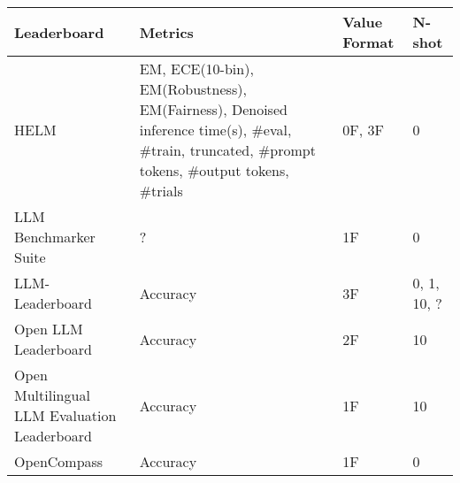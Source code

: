 \begin{tabular}{llll}
\toprule
Leaderboard & Metrics & Value Format & N-shot \\
\midrule
HELM & EM, ECE(10-bin), EM(Robustness), EM(Fairness), Denoised inference time(s), \#eval, \#train, truncated, \#prompt tokens, \#output tokens, \#trials & 0F, 3F & 0 \\
LLM Benchmarker Suite & ? & 1F & 0 \\
LLM-Leaderboard & Accuracy & 3F & 0, 1, 10, ? \\
Open LLM Leaderboard & Accuracy & 2F & 10 \\
Open Multilingual LLM Evaluation Leaderboard & Accuracy & 1F & 10 \\
OpenCompass & Accuracy & 1F & 0 \\
\bottomrule
\end{tabular}

